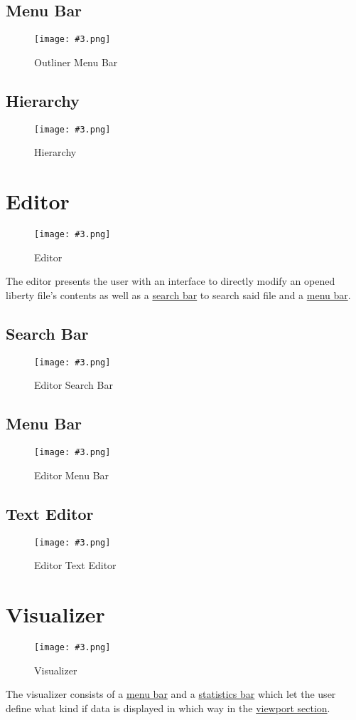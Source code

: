 \documentclass[10pt,a4paper]{report}
\newcommand{\refer}[2]{\hyperref[#1]{\textcolor{col:reference}{#2}}}
\newcommand{\h}[1]{\textcolor{col:highlight}{#1}}
\newcommand{\includeimage}[5]{
    \begin{figure}[H]
        #1
        \texttt{[image: \#3.png]}
        \caption{#4}
        \label{fig:#5}
    \end{figure}
}
\begin{document}
\subsection{Menu Bar}
\label{sec:outliner:menu}

\includeimage{}{0.4}{Outliner Menu Bar}{Outliner Menu Bar}{outliner_menu_bar}

\subsection{Hierarchy}
\label{sec:outliner:hierarchy}

\includeimage{}{0.4}{Hierarchy}{Hierarchy}{hierarchy}

\section{Editor}
\label{sec:editor}
\includeimage{}{0.4}{Editor}{Editor}{editor}
The \h{editor} presents the user with an interface to directly modify an opened liberty file's contents as well as a \refer{sec:editor:search}{search bar} to search said file and a \refer{sec:editor:menu}{menu bar}.

\subsection{Search Bar}
\label{sec:editor:search}

\includeimage{}{0.4}{Editor Search Bar}{Editor Search Bar}{editor_search_bar}

\subsection{Menu Bar}
\label{sec:editor:menu}

\includeimage{}{0.4}{Editor Menu Bar}{Editor Menu Bar}{editor_menu_bar}

\subsection{Text Editor}
\label{sec:editor:text_editor}

\includeimage{}{0.4}{Editor Text Editor}{Editor Text Editor}{editor_text_editor}

\section{Visualizer}
\includeimage{}{0.4}{Visualizer}{Visualizer}{visualizer}
\label{sec:visualizer}
The \h{visualizer} consists of a \refer{sec:visualizer:menu}{menu bar} and a \refer{sec:visualizer:statistics}{statistics bar} which let the user define what kind if data is displayed in which way in the \refer{sec:visualizer:viewport}{viewport section}.
\end{document}

